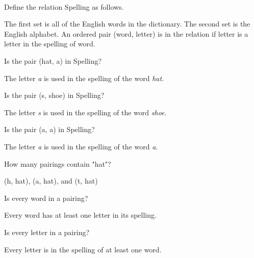 \documentclass{ximera}
\begin{document}
\begin{exercise}
\quad \\
Define the relation Spelling as follows.

The first set is all of the English words in the dictionary. The second set is the English alphabet. An ordered pair (word, letter) is in the relation if letter is a letter in the spelling of word.


\begin{problem} Is the pair (hat, a) in Spelling? 
\begin{feedback}
The letter \textit{a} is used in the spelling of the word \textit{hat}.
\end{feedback}
\end{problem}


\begin{problem} Is the pair (s, shoe) in Spelling? 
\begin{feedback}
The letter \textit{s} is used in the spelling of the word \textit{shoe}.
\end{feedback}
\end{problem}


\begin{problem} Is the pair (a, a) in Spelling? 
\begin{feedback}
The letter \textit{a} is used in the spelling of the word \textit{a}.
\end{feedback}
\end{problem}


\begin{problem} How many pairings contain "hat"? 
\begin{feedback}
(h, hat), (a, hat), and (t, hat)
\end{feedback}
\end{problem}


\begin{problem} Is every word in a pairing? 
\begin{feedback}
Every word has at least one letter in its spelling.
\end{feedback}
\end{problem}


\begin{problem} Is every letter in a pairing? 
\begin{feedback}
Every letter is in the spelling of at least one word.
\end{feedback}
\end{problem}




\end{exercise}
\end{document}
